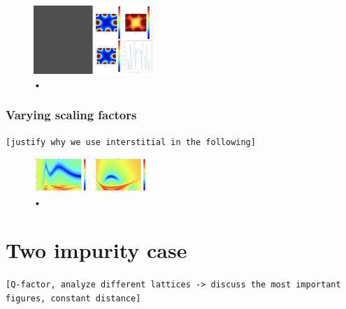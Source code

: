 \documentclass[aps,pra,superscriptaddress,twocolumn]{revtex4-1}
\newcommand{\commentSO}[1]{\texttt{\color{orange}[#1]}}
\begin{document}
\begin{figure}
    \centering
    \includegraphics[width=0.4\textwidth]{figures/mono_rect_plaquettes_substitution.png} 
    \caption{•}
    \label{fig:mono_rect_plaquette_substitution}
\end{figure}

\subsubsection{Varying scaling factors}
\commentSO{justify why we use interstitial in the following}

\begin{figure}
    \centering
    \includegraphics[width=0.4\textwidth]{figures/mono_rect_thetadelta.png} 
    \caption{•}
    \label{fig:mono_rect_thetadelta}
\end{figure}


\section{Two impurity case}
\commentSO{Q-factor, analyze different lattices -> discuss the most important figures, constant distance}
\end{document}
